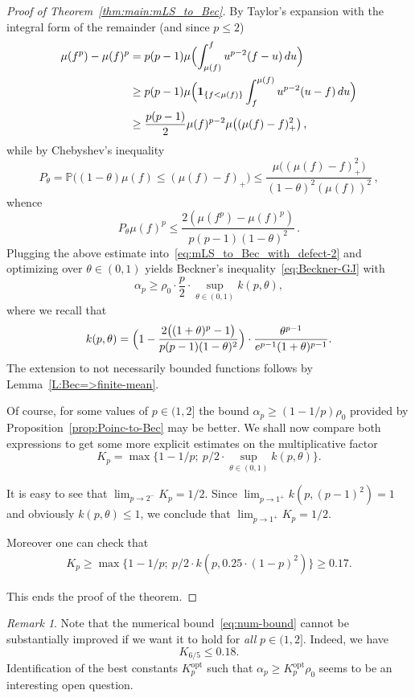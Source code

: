 \documentclass[a4paper]{amsart}
\theoremstyle{definition}
\theoremstyle{remark}
\newtheorem{remark}[theorem]{Remark}
\numberwithin{equation}{section}
\newcommand*{\opt}{\text{opt}}
\newcommand*{\ind}[1]{\mathbf{1}_{#1}}
\begin{document}
\begin{proof}[Proof of Theorem~\ref{thm:main:mLS_to_Bec}]
	
	By Taylor's expansion with the integral form of the remainder (and since $p\leq 2$)
	\begin{align*}
		\mu (f^p) - \mu (f)^p	
		&=
		p(p-1)\mu\Bigl( \int_{\mu(f)}^{f}u^{p-2}(f-u)\,du \Bigr)\\
		&\ge
		p(p-1)\mu\Bigl( \ind{\lbrace f<\mu(f) \rbrace} \int_{f}^{\mu (f)}u^{p-2}(u-f)\,du \Bigr)\\
		&\ge
		\frac{p(p-1)}{2} \mu (f)^{p-2} \mu \bigl((\mu(f) - f)_{+}^2\bigr)\,,
	\end{align*}
	while by Chebyshev's inequality
	\[
		P_\theta = \mathbb{P}\bigl((1-\theta)\mu (f) \le (\mu (f) - f)_+ \bigr)
		\le
		\frac{\mu \bigl( (\mu (f)- f)_+^2 \bigr)}{(1-\theta)^2(\mu (f))^2}\,,
	\]
	whence
	\[
		P_\theta \mu(f)^{p} \le \frac{2(\mu (f^p) - \mu(f)^p)}{p(p-1)(1-\theta)^2}\,.
	\]
	Plugging the above estimate into~\eqref{eq:mLS_to_Bec_with_defect-2} and optimizing over $\theta\in(0,1)$ yields
	Beckner's inequality~\eqref{eq:Beckner-GJ} with
	\[
	\alpha_p \geq \rho_0 \cdot \frac{p}{2}\cdot\!\sup_{\theta\in(0,1)} k(p,\theta),
  		\]
  		where we recall that
  		\[
  		 k(p,\theta)  =
  		 \Bigl(1 - \frac{2\bigl((1+ \theta)^{p}-1 \bigr)}{p(p-1)(1-\theta)^2} \Bigr) \cdot
  		\frac{\theta^{p-1}}{e^{p-1}(1+\theta)^{p-1}}.
  		\]
    The extension to not necessarily bounded functions follows by Lemma~\ref{L:Bec=>finite-mean}.
	
	Of course, for some values of $p\in(1,2]$ the bound $\alpha_p\geq (1-1/p)\rho_0$ provided by Proposition~\ref{prop:Poinc-to-Bec} may be better. We shall now compare both expressions to get some more explicit estimates on the multiplicative factor
	\[
	K_p = \max\{ 1-1/p;\ p/2 \cdot\! \sup_{\theta\in(0,1)} k(p,\theta)\}.	
	\]
	
	It is easy to see that $\lim_{p\to 2^-} K_p =1/2$. Since $\lim_{p\to 1^+} k(p,(p-1)^2) = 1$ and obviously $k(p,\theta)\leq 1$, we  conclude that $\lim_{p\to 1^+} K_p =1/2$.
	
	Moreover one can check that
	\begin{align}\label{eq:num-bound}
	K_p\geq \max\{1-1/p;\ p/2 \cdot k(p,0.25 \cdot (1-p)^2) \} \geq 0.17.
	\end{align}
	
	This ends the proof of the theorem.
	\end{proof}
\begin{remark}
Note that the numerical bound~\eqref{eq:num-bound} cannot be substantially improved if we want it to hold for \emph{all} $p\in(1,2]$. Indeed, we have
	\[
	 K_{6/5}
	 \leq 0.18.
	\]
Identification of the best constants $K^\opt_p$ such that $\alpha_p \ge K^\opt_p\rho_0$ seems to be an interesting open question.	
\end{remark}
\end{document}
